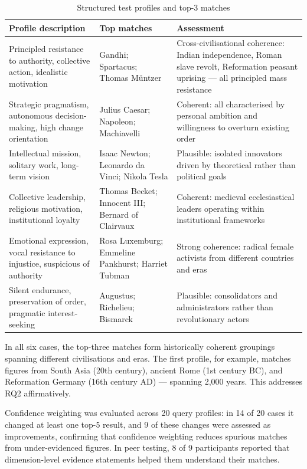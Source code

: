 \documentclass[11pt, a4paper]{report}
\begin{document}
\begin{table}[H]
  \centering
  \caption{Structured test profiles and top-3 matches}
  \label{tab:profiles}
  \begin{tabular}{p{3.5cm}p{3cm}p{6cm}}
    \toprule
    Profile description & Top matches & Assessment \\
    \midrule
    Principled resistance to authority, collective action, idealistic motivation & Gandhi; Spartacus; Thomas M\"{u}ntzer & Cross-civilisational coherence: Indian independence, Roman slave revolt, Reformation peasant uprising — all principled mass resistance \\
    \midrule
    Strategic pragmatism, autonomous decision-making, high change orientation & Julius Caesar; Napoleon; Machiavelli & Coherent: all characterised by personal ambition and willingness to overturn existing order \\
    \midrule
    Intellectual mission, solitary work, long-term vision & Isaac Newton; Leonardo da Vinci; Nikola Tesla & Plausible: isolated innovators driven by theoretical rather than political goals \\
    \midrule
    Collective leadership, religious motivation, institutional loyalty & Thomas Becket; Innocent III; Bernard of Clairvaux & Coherent: medieval ecclesiastical leaders operating within institutional frameworks \\
    \midrule
    Emotional expression, vocal resistance to injustice, suspicious of authority & Rosa Luxemburg; Emmeline Pankhurst; Harriet Tubman & Strong coherence: radical female activists from different countries and eras \\
    \midrule
    Silent endurance, preservation of order, pragmatic interest-seeking & Augustus; Richelieu; Bismarck & Plausible: consolidators and administrators rather than revolutionary actors \\
    \bottomrule
  \end{tabular}
\end{table}

In all six cases, the top-three matches form historically coherent groupings spanning different civilisations and eras. The first profile, for example, matches figures from South Asia (20th century), ancient Rome (1st century BC), and Reformation Germany (16th century AD) — spanning 2,000 years. This addresses RQ2 affirmatively.

Confidence weighting was evaluated across 20 query profiles: in 14 of 20 cases it changed at least one top-5 result, and 9 of these changes were assessed as improvements, confirming that confidence weighting reduces spurious matches from under-evidenced figures. In peer testing, 8 of 9 participants reported that dimension-level evidence statements helped them understand their matches.
\end{document}
